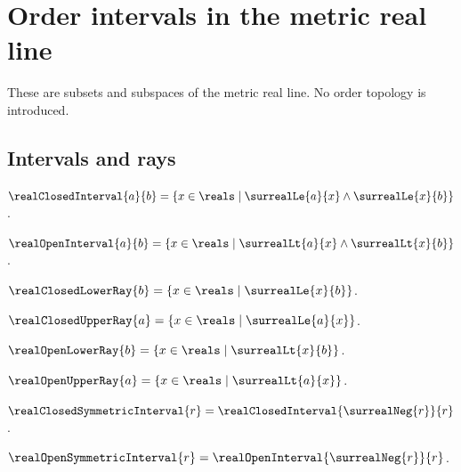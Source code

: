 



\section{Order intervals in the metric real line}

These are subsets and subspaces of the metric real line.  No order topology
is introduced.

\subsection{Intervals and rays}

\begin{definition}\label{real_closed_interval}
    $\realClosedInterval{a}{b}=\{x\in\reals\mid
        \surrealLe{a}{x}\land\surrealLe{x}{b}\}$.
\end{definition}

\begin{definition}\label{real_open_interval}
    $\realOpenInterval{a}{b}=\{x\in\reals\mid
        \surrealLt{a}{x}\land\surrealLt{x}{b}\}$.
\end{definition}

\begin{definition}\label{real_closed_lower_ray}
    $\realClosedLowerRay{b}=\{x\in\reals\mid\surrealLe{x}{b}\}$.
\end{definition}

\begin{definition}\label{real_closed_upper_ray}
    $\realClosedUpperRay{a}=\{x\in\reals\mid\surrealLe{a}{x}\}$.
\end{definition}

\begin{definition}\label{real_open_lower_ray}
    $\realOpenLowerRay{b}=\{x\in\reals\mid\surrealLt{x}{b}\}$.
\end{definition}

\begin{definition}\label{real_open_upper_ray}
    $\realOpenUpperRay{a}=\{x\in\reals\mid\surrealLt{a}{x}\}$.
\end{definition}

\begin{definition}\label{real_closed_symmetric_interval}
    $\realClosedSymmetricInterval{r}=
        \realClosedInterval{\surrealNeg{r}}{r}$.
\end{definition}

\begin{definition}\label{real_open_symmetric_interval}
    $\realOpenSymmetricInterval{r}=
        \realOpenInterval{\surrealNeg{r}}{r}$.
\end{definition}


